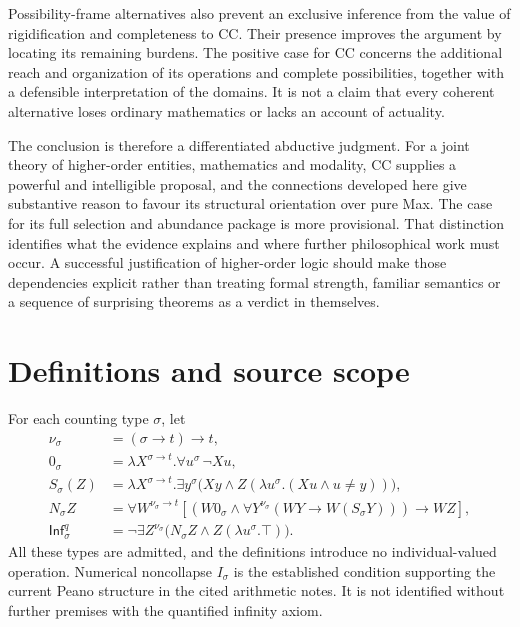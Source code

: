 \documentclass[11pt]{article}
\newcommand{\Infq}{\mathsf{Inf}^{q}}
\begin{document}
Possibility-frame alternatives also prevent an exclusive inference from the value of rigidification and completeness to CC. Their presence improves the argument by locating its remaining burdens. The positive case for CC concerns the additional reach and organization of its operations and complete possibilities, together with a defensible interpretation of the domains. It is not a claim that every coherent alternative loses ordinary mathematics or lacks an account of actuality.

The conclusion is therefore a differentiated abductive judgment. For a joint theory of higher-order entities, mathematics and modality, CC supplies a powerful and intelligible proposal, and the connections developed here give substantive reason to favour its structural orientation over pure Max. The case for its full selection and abundance package is more provisional. That distinction identifies what the evidence explains and where further philosophical work must occur. A successful justification of higher-order logic should make those dependencies explicit rather than treating formal strength, familiar semantics or a sequence of surprising theorems as a verdict in themselves.

\appendix
\section{Definitions and source scope}\label{app:definitions}

For each counting type $\sigma$, let
\begin{align*}
 \nu_\sigma&=(\sigma\to t)\to t,\\
 0_\sigma&=\lambda X^{\sigma\to t}.\forall u^\sigma\,\neg Xu,\\
 S_\sigma(Z)&=\lambda X^{\sigma\to t}.\exists y^\sigma
 \bigl(Xy\land Z(\lambda u^\sigma.(Xu\land u\ne y))\bigr),\\
 N_\sigma Z&=\forall W^{\nu_\sigma\to t}
 \left[\left(W0_\sigma\land
 \forall Y^{\nu_\sigma}(WY\to W(S_\sigma Y))\right)\to WZ\right],\\
 \Infq_\sigma&=\neg\exists Z^{\nu_\sigma}
 \bigl(N_\sigma Z\land Z(\lambda u^\sigma.\top)\bigr).
\end{align*}
All these types are admitted, and the definitions introduce no individual-valued operation. Numerical noncollapse $I_\sigma$ is the established condition supporting the current Peano structure in the cited arithmetic notes. It is not identified without further premises with the quantified infinity axiom.
\end{document}
